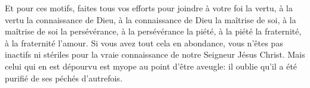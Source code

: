 Et pour ces motifs, faites tous vos efforts pour joindre à votre foi la vertu,
	à la vertu la connaissance de Dieu,
	à la connaissance de Dieu la maîtrise de soi,
	à la maîtrise de soi la persévérance,
	à la persévérance la piété,
	à la piété la fraternité,
	à la fraternité l’amour.
Si vous avez tout cela en abondance,
	vous n’êtes pas inactifs ni stériles
		pour la vraie connaissance de notre Seigneur Jésus Christ.
Mais celui qui en est dépourvu est myope au point d’être aveugle:
	il oublie qu’il a été purifié de ses péchés d’autrefois.
